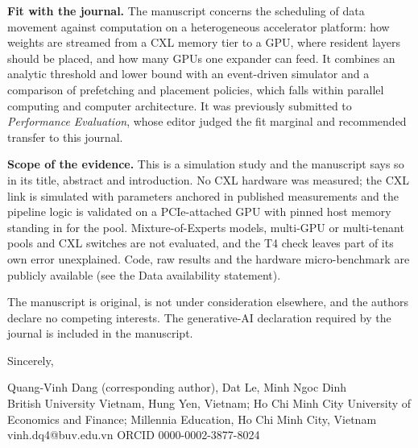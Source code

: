 \documentclass[11pt]{article}
\begin{document}
\textbf{Fit with the journal.} The manuscript concerns the scheduling of data movement against computation on a heterogeneous accelerator platform: how weights are streamed from a CXL memory tier to a GPU, where resident layers should be placed, and how many GPUs one expander can feed. It combines an analytic threshold and lower bound with an event-driven simulator and a comparison of prefetching and placement policies, which falls within parallel computing and computer architecture. It was previously submitted to \emph{Performance Evaluation}, whose editor judged the fit marginal and recommended transfer to this journal.

\textbf{Scope of the evidence.} This is a simulation study and the manuscript says so in its title, abstract and introduction. No CXL hardware was measured; the CXL link is simulated with parameters anchored in published measurements and the pipeline logic is validated on a PCIe-attached GPU with pinned host memory standing in for the pool. Mixture-of-Experts models, multi-GPU or multi-tenant pools and CXL switches are not evaluated, and the T4 check leaves part of its own error unexplained. Code, raw results and the hardware micro-benchmark are publicly available (see the Data availability statement).

The manuscript is original, is not under consideration elsewhere, and the authors declare no competing interests. The generative-AI declaration required by the journal is included in the manuscript.

Sincerely,

Quang-Vinh Dang (corresponding author), Dat Le, Minh Ngoc Dinh\\
British University Vietnam, Hung Yen, Vietnam; Ho Chi Minh City University of Economics and Finance; Millennia Education, Ho Chi Minh City, Vietnam\\
vinh.dq4@buv.edu.vn \quad ORCID 0000-0002-3877-8024
\end{document}
